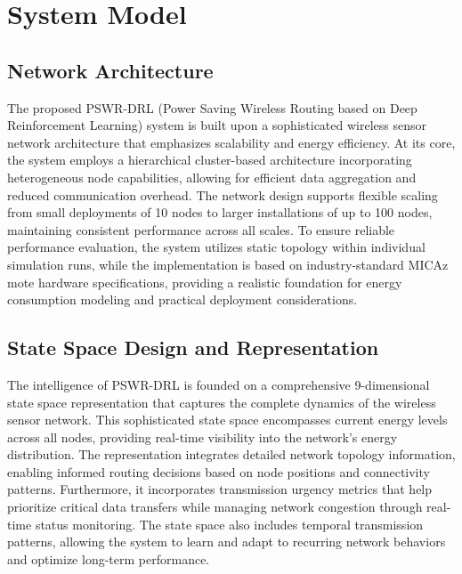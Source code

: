 \section{System Model}
\label{sec:system_model}

\subsection{Network Architecture}
The proposed PSWR-DRL (Power Saving Wireless Routing based on Deep Reinforcement Learning) system is built upon a sophisticated wireless sensor network architecture that emphasizes scalability and energy efficiency. At its core, the system employs a hierarchical cluster-based architecture incorporating heterogeneous node capabilities, allowing for efficient data aggregation and reduced communication overhead. The network design supports flexible scaling from small deployments of 10 nodes to larger installations of up to 100 nodes, maintaining consistent performance across all scales. To ensure reliable performance evaluation, the system utilizes static topology within individual simulation runs, while the implementation is based on industry-standard MICAz mote hardware specifications, providing a realistic foundation for energy consumption modeling and practical deployment considerations.

\subsection{State Space Design and Representation}
The intelligence of PSWR-DRL is founded on a comprehensive 9-dimensional state space representation that captures the complete dynamics of the wireless sensor network. This sophisticated state space encompasses current energy levels across all nodes, providing real-time visibility into the network's energy distribution. The representation integrates detailed network topology information, enabling informed routing decisions based on node positions and connectivity patterns. Furthermore, it incorporates transmission urgency metrics that help prioritize critical data transfers while managing network congestion through real-time status monitoring. The state space also includes temporal transmission patterns, allowing the system to learn and adapt to recurring network behaviors and optimize long-term performance.

